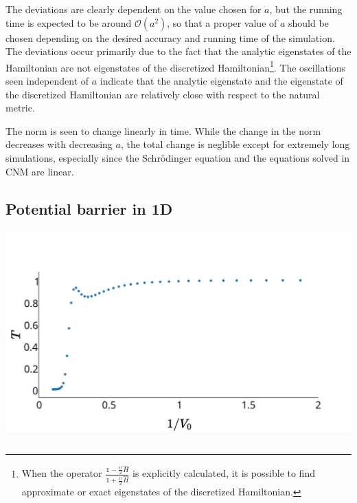 The deviations are clearly dependent on the value chosen for $a$, but the running time is expected to be around $\mathcal{O}(a^2)$, so that a proper value of $a$ should be chosen depending on the desired accuracy and running time of the simulation. The deviations occur primarily due to the fact that the analytic eigenstates of the Hamiltonian are not eigenstates of the discretized Hamiltonian\footnote{When the operator $\frac{\mathbb{1}-\frac{i\tau}{2}\hat{H}}{\mathbb{1}+\frac{i\tau}{2}\hat{H}}$ is explicitly calculated, it is possible to find approximate or exact eigenstates of the discretized Hamiltonian.}. The oscillations seen independent of $a$ indicate that the analytic eigenstate and the eigenstate of the discretized Hamiltonian are relatively close with respect to the natural metric.


The norm is seen to change linearly in time. While the change in the norm decreases with decreasing $a$, the total change is neglible except for extremely long simulations, especially since the Schr\"{o}dinger equation and the equations solved in CNM are linear.


\subsection*{Potential barrier in 1D}
\begin{Figure}
    \centering
    \includegraphics[width=\linewidth]{transmission_1d_pot_barrier.pdf}
    \label{fig:transmission}
\end{Figure}

\subsection*{}

